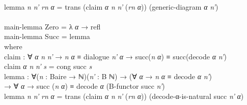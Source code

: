 \documentclass{entcs} \usepackage{prentcsmacro}
\newcommand{\AgdaFontStyle}[1]{\textsf{#1}}
\newcommand{\AgdaBoundFontStyle}[1]{\textit{#1}}
\newcommand{\AgdaKeyword}     [1]
    {\AgdaFontStyle{\textcolor{AgdaKeyword}{#1}}}
\newcommand{\AgdaSymbol}      [1]{\textcolor{AgdaSymbol}{#1}}
\newcommand{\AgdaBound}    [1]{\AgdaBoundFontStyle{\textcolor{AgdaBound}{#1}}}
\newcommand{\AgdaInductiveConstructor}[1]
    {\AgdaFontStyle{\textcolor{AgdaInductiveConstructor}{#1}}}
\newcommand{\AgdaDatatype} [1]{\AgdaFontStyle{\textcolor{AgdaDatatype}{#1}}}
\newcommand{\AgdaFunction} [1]{\AgdaFontStyle{\textcolor{AgdaFunction}{#1}}}
\newcommand{\AgdaIndent}[1]{\quad}
\newcommand{\AgdaCodeStyle}{\small}
\newenvironment{code}%
{\noindent\AgdaCodeStyle\pboxed}%
{\endpboxed\par\noindent%
\ignorespacesafterend}
\begin{document}
\begin{code}
\\
\>[0]\AgdaIndent{4}{}\<[4]%
\>[4]\AgdaFunction{lemma} \AgdaBound{n} \AgdaBound{n'} \AgdaBound{rn} \AgdaBound{α} \AgdaSymbol{=} \AgdaFunction{trans} \AgdaSymbol{(}\AgdaFunction{claim} \AgdaBound{α} \AgdaBound{n} \AgdaBound{n'} \AgdaSymbol{(}\AgdaBound{rn} \AgdaBound{α}\AgdaSymbol{))} \AgdaSymbol{(}\AgdaFunction{generic-diagram} \AgdaBound{α} \AgdaBound{n'}\AgdaSymbol{)} \<[73]%
\>[73]\<%
\\
%
\\
\>\AgdaFunction{main-lemma} \AgdaInductiveConstructor{Zero} \AgdaSymbol{=} \AgdaSymbol{λ} \AgdaBound{α} \AgdaSymbol{→} \AgdaInductiveConstructor{refl}\<%
\\
\>\AgdaFunction{main-lemma} \AgdaInductiveConstructor{Succ} \AgdaSymbol{=} \AgdaFunction{lemma}\<%
\\
\>[0]\AgdaIndent{2}{}\<[2]%
\>[2]\AgdaKeyword{where} \<[8]%
\>[8]\<%
\\
\>[2]\AgdaIndent{4}{}\<[4]%
\>[4]\AgdaFunction{claim} \AgdaSymbol{:} \AgdaSymbol{∀} \AgdaBound{α} \AgdaBound{n} \AgdaBound{n'} \AgdaSymbol{→} \AgdaBound{n} \AgdaBound{α} \AgdaDatatype{≡} \AgdaFunction{dialogue} \AgdaBound{n'} \AgdaBound{α} \AgdaSymbol{→} \AgdaInductiveConstructor{succ}\AgdaSymbol{(}\AgdaBound{n} \AgdaBound{α}\AgdaSymbol{)} \AgdaDatatype{≡} \AgdaInductiveConstructor{succ}\AgdaSymbol{(}\AgdaFunction{decode} \AgdaBound{α} \AgdaBound{n'}\AgdaSymbol{)}\<%
\\
\>[2]\AgdaIndent{4}{}\<[4]%
\>[4]\AgdaFunction{claim} \AgdaBound{α} \AgdaBound{n} \AgdaBound{n'} \AgdaBound{s} \AgdaSymbol{=} \AgdaFunction{cong} \AgdaInductiveConstructor{succ} \AgdaBound{s} \<[34]%
\>[34]\<%
\\
\>[2]\AgdaIndent{4}{}\<[4]%
\>[4]\AgdaFunction{lemma} \AgdaSymbol{:} \AgdaSymbol{∀(}\AgdaBound{n} \AgdaSymbol{:} \AgdaFunction{Baire} \AgdaSymbol{→} \AgdaDatatype{ℕ}\AgdaSymbol{)(}\AgdaBound{n'} \AgdaSymbol{:} \AgdaFunction{B} \AgdaDatatype{ℕ}\AgdaSymbol{)} \AgdaSymbol{→} \AgdaSymbol{(∀} \AgdaBound{α} \AgdaSymbol{→} \AgdaBound{n} \AgdaBound{α} \AgdaDatatype{≡} \AgdaFunction{decode} \AgdaBound{α} \AgdaBound{n'}\AgdaSymbol{)}\<%
\\
\>[4]\AgdaIndent{10}{}\<[10]%
\>[10]\AgdaSymbol{→} \AgdaSymbol{∀} \AgdaBound{α} \AgdaSymbol{→} \AgdaInductiveConstructor{succ} \AgdaSymbol{(}\AgdaBound{n} \AgdaBound{α}\AgdaSymbol{)} \AgdaDatatype{≡} \AgdaFunction{decode} \AgdaBound{α} \AgdaSymbol{(}\AgdaFunction{B-functor} \AgdaInductiveConstructor{succ} \AgdaBound{n'}\AgdaSymbol{)}\<%
\\
\>[0]\AgdaIndent{4}{}\<[4]%
\>[4]\AgdaFunction{lemma} \AgdaBound{n} \AgdaBound{n'} \AgdaBound{rn} \AgdaBound{α} \AgdaSymbol{=} \AgdaFunction{trans} \AgdaSymbol{(}\AgdaFunction{claim} \AgdaBound{α} \AgdaBound{n} \AgdaBound{n'} \AgdaSymbol{(}\AgdaBound{rn} \AgdaBound{α}\AgdaSymbol{))} \AgdaSymbol{(}\AgdaFunction{decode-α-is-natural} \AgdaInductiveConstructor{succ} \AgdaBound{n'} \AgdaBound{α}\AgdaSymbol{)}\<%
\\
\>\<\end{code}
\end{document}
